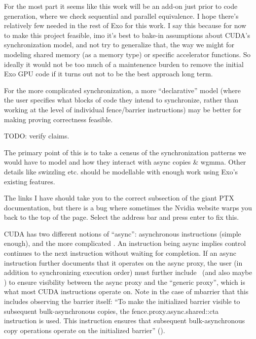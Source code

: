 \filbreak
{}

For the most part it seems like this work will be an add-on just prior to code generation, where we check sequential and parallel equivalence. I hope there's relatively few  needed in the rest of Exo for this work. I say this because for now to make this project feasible, imo it's best to bake-in assumptions about CUDA's synchronization model, and not try to generalize that, the way we might for modeling shared memory (as a memory type) or specific accelerator functions. So ideally it would not be too much of a maintenence burden to remove the initial Exo GPU code if it turns out not to be the best approach long term.

\filbreak
For the more complicated synchronization, a more ``declarative'' model (where the user specifies what blocks of code they intend to synchronize, rather than working at the level of individual fence/barrier instructions) may be better for making proving correctness feasible.

\filbreak
{}

TODO: verify  claims.

The primary point of this is to take a census of the synchronization patterns we would have to model and how they interact with async copies \& wgmma. Other details like swizzling etc. should be modellable with enough work using Exo's existing features.

 The links I have should take you to the correct subsection of the giant PTX documentation, but there is a bug where sometimes the Nvidia website warps you back to the top of the page. Select the address bar and press enter to fix this.

\filbreak
{}

CUDA has two different notions of ``async'': asynchronous instructions (simple enough), and the more complicated . An instruction being async implies control continues to the next instruction without waiting for completion. If an async instruction further documents that it operates on the async proxy, the user (in addition to synchronizing execution order) must further include \fenceProxyAsync\ (and also maybe ) to ensure visibility between the async proxy and the ``generic proxy'', which is what most CUDA instructions operate on. Note in the case of mbarrier that this includes observing the barrier itself: ``To make the initialized barrier visible to subsequent bulk-asynchronous copies, the fence.proxy.async.shared::cta instruction is used. This instruction ensures that subsequent bulk-asynchronous copy operations operate on the initialized barrier'' ().

